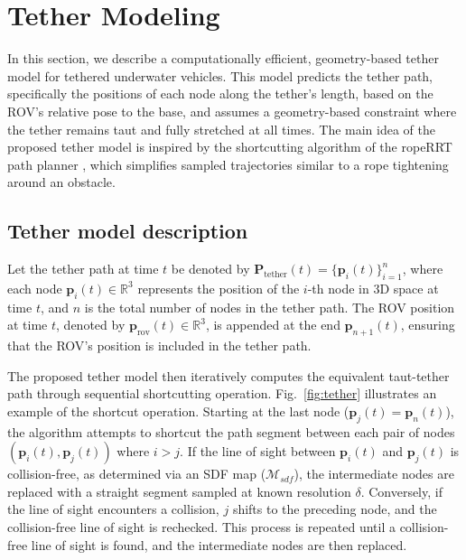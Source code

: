 \section{Tether Modeling}
\label{sec:tether_model}

 In this section, we describe a computationally efficient, geometry-based tether model for tethered underwater vehicles. This model predicts the tether path, specifically the positions of each node along the tether's length, based on the \ac{ROV}'s relative pose to the base, and assumes a geometry-based constraint where the tether remains taut and fully stretched at all times. The main idea of the proposed tether model is inspired by the shortcutting algorithm of the ropeRRT path planner \cite{roperrt}, which simplifies sampled trajectories similar to a rope tightening around an obstacle. 


\subsection{Tether model description}
Let the tether path at time \( t \) be denoted by \( \mathbf{P}_{\mathrm{tether}}(t) = \{ \mathbf{p}_i(t) \}_{i=1}^{n} \), where each node \( \mathbf{p}_i(t) \in \mathbb{R}^3 \) represents the position of the \( i \)-th node in 3D space at time \( t \), and \( n \) is the total number of nodes in the tether path. The \ac{ROV} position at time \( t \), denoted by \( \mathbf{p}_{\mathrm{rov}}(t) \in \mathbb{R}^3 \), is appended at the end \( \mathbf{p}_{n+1}(t) \), ensuring that the \ac{ROV}'s position is included in the tether path. 

The proposed tether model then iteratively computes the equivalent taut-tether path through sequential shortcutting operation. Fig.~\ref{fig:tether} illustrates an example of the shortcut operation. Starting at the last node ($\mathbf{p}_j(t) = \mathbf{p}_{n}(t)$), the algorithm attempts to shortcut the path segment between each pair of nodes \( (\mathbf{p}_i(t), \mathbf{p}_j(t)) \) where \( i > j \).
If the line of sight between \( \mathbf{p}_i(t) \) and \( \mathbf{p}_j(t) \) is collision-free, as determined via an \ac{SDF} map (\( \mathcal{M}_{sdf} \)), the intermediate nodes are replaced with a straight segment sampled at known resolution \( \delta \). Conversely, if the line of sight encounters a collision, $j$ shifts to the preceding node, and the collision-free line of sight is rechecked. This process is repeated until a collision-free line of sight is found, and the intermediate nodes are then replaced. 

